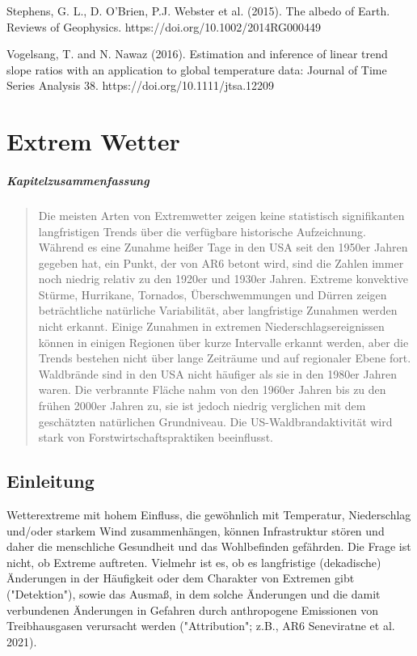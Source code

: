 \documentclass[12pt,paper=a4,DIV=12,parskip=never,chapterprefix=false,headings=standardclasses]{scrreprt}
\newcommand{\FigureNumbersBySection}{%
  \counterwithout{figure}{chapter}%
  \counterwithin{figure}{section}%
}
\begin{document}
Stephens, G. L., D. O'Brien, P.J. Webster et al. (2015). The albedo of Earth. Reviews of Geophysics.
https://doi.org/10.1002/2014RG000449

Vogelsang, T. and N. Nawaz (2016). Estimation and inference of linear trend slope ratios with an
application to global temperature data: Journal of Time Series Analysis 38.
https://doi.org/10.1111/jtsa.12209
\endgroup

\cleardoublepage
\FigureNumbersBySection
\chapter{Extrem Wetter}
\paragraph{Kapitelzusammenfassung}
\begin{quote}
Die meisten Arten von Extremwetter zeigen keine statistisch signifikanten langfristigen Trends über die verfügbare historische Aufzeichnung. Während es eine Zunahme heißer Tage in den USA seit den 1950er Jahren gegeben hat, ein Punkt, der von AR6 betont wird, sind die Zahlen immer noch niedrig relativ zu den 1920er und 1930er Jahren. Extreme konvektive Stürme, Hurrikane, Tornados, Überschwemmungen und Dürren zeigen beträchtliche natürliche Variabilität, aber langfristige Zunahmen werden nicht erkannt.
Einige Zunahmen in extremen Niederschlagsereignissen können in einigen Regionen über kurze Intervalle erkannt werden, aber die Trends bestehen nicht über lange Zeiträume und auf regionaler Ebene fort. Waldbrände sind in den USA nicht häufiger als sie in den 1980er Jahren waren. Die verbrannte Fläche nahm von den 1960er Jahren bis zu den frühen 2000er Jahren zu, sie ist jedoch niedrig verglichen mit dem geschätzten natürlichen Grundniveau. Die US-Waldbrandaktivität wird stark von Forstwirtschaftspraktiken beeinflusst.
\end{quote}

\section{Einleitung}
Wetterextreme mit hohem Einfluss, die gewöhnlich mit Temperatur, Niederschlag und/oder starkem Wind zusammenhängen, können Infrastruktur stören und daher die menschliche Gesundheit und das Wohlbefinden gefährden. Die Frage ist nicht, ob Extreme auftreten. Vielmehr ist es, ob es langfristige (dekadische) Änderungen in der Häufigkeit oder dem Charakter von Extremen gibt ("Detektion"), sowie das Ausmaß, in dem solche Änderungen und die damit verbundenen Änderungen in Gefahren durch anthropogene Emissionen von Treibhausgasen verursacht werden ("Attribution"; z.B., AR6 Seneviratne et al. 2021).
\end{document}
